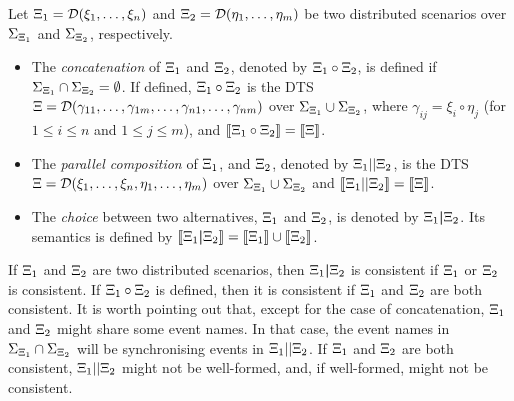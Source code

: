 \begin{definition}
   \label{def-comp-par-alt-dts}
Let $\Xi_1=\mathcal{D}(\xi_1,\dots,\xi_n)$ and
$\Xi_2=\mathcal{D}(\eta_1,\dots,\eta_m)$ be two distributed
scenarios over $\Sigma_{\Xi_1}$ and $\Sigma_{\Xi_2}$,
respectively.
\begin{itemize}[noitemsep]
  \item
The \emph{concatenation} of
$\Xi_1$ and $\Xi_2$, denoted by
$\Xi_1\circ\Xi_2$, is defined if
$\Sigma_{\Xi_1}\cap\Sigma_{\Xi_2}=\emptyset$.
If defined, $\Xi_1\circ\Xi_2$ is
the DTS
$\Xi=\mathcal{D}(\gamma_{11},\dots,\gamma_{1m},\dots,\gamma_{n1},\dots,\gamma_{nm})$
over
$\Sigma_{\Xi_1}\cup\Sigma_{\Xi_2}$, where
$\gamma_{ij}=\xi_i\circ\eta_j$ (for $1\leq i\leq n$
and $1\leq j\leq m$),
and
$\llbracket \Xi_1\circ\Xi_2 \rrbracket=\llbracket \Xi \rrbracket$.
\item
  The \emph{parallel composition} of $\Xi_1$, and
  $\Xi_2$, denoted by $\Xi_1||\Xi_2$, is the DTS
  $\Xi=\mathcal{D}(\xi_1,\dots,\xi_n,\eta_1,\dots,\eta_m)$
  over $\Sigma_{\Xi_1}\cup\Sigma_{\Xi_2}$ and
  $\llbracket \Xi_1||\Xi_2 \rrbracket =\llbracket \Xi \rrbracket$.
\item
   The \emph{choice} between two alternatives,
$\Xi_1$ and $\Xi_2$, is denoted by
$\Xi_1\boldsymbol{|}\Xi_2$.
Its semantics is defined by $\llbracket \Xi_1\boldsymbol{|}\Xi_2 \rrbracket =
 \llbracket \Xi_1 \rrbracket\cup\llbracket \Xi_2 \rrbracket$.
  \end{itemize}
\end{definition}
\noindent
If $\Xi_1$ and $\Xi_2$ are two distributed scenarios,
then $\Xi_1\boldsymbol{|}\Xi_2$ is consistent if $\Xi_1$ or
$\Xi_2$ is consistent.
If $\Xi_1\circ\Xi_2$ is defined, then it is consistent
if $\Xi_1$ and $\Xi_2$ are both consistent.
It is worth pointing out that, except for the case of concatenation,
$\Xi_1$ and $\Xi_2$ might share some event names. In
that case, the event names in
$\Sigma_{\Xi_1}\cap\Sigma_{\Xi_2}$ will be synchronising
events in $\Xi_1||\Xi_2$. If $\Xi_1$ and
$\Xi_2$ are both consistent, $\Xi_1||\Xi_2$
might not be well-formed, and, if well-formed, might not be consistent.

